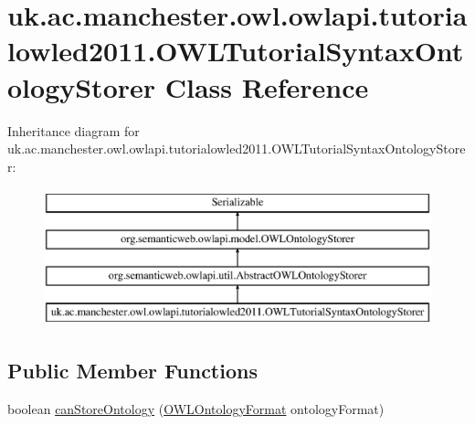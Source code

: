 \hypertarget{classuk_1_1ac_1_1manchester_1_1owl_1_1owlapi_1_1tutorialowled2011_1_1_o_w_l_tutorial_syntax_ontology_storer}{\section{uk.\-ac.\-manchester.\-owl.\-owlapi.\-tutorialowled2011.\-O\-W\-L\-Tutorial\-Syntax\-Ontology\-Storer Class Reference}
\label{classuk_1_1ac_1_1manchester_1_1owl_1_1owlapi_1_1tutorialowled2011_1_1_o_w_l_tutorial_syntax_ontology_storer}
}
Inheritance diagram for uk.\-ac.\-manchester.\-owl.\-owlapi.\-tutorialowled2011.\-O\-W\-L\-Tutorial\-Syntax\-Ontology\-Storer\-:\begin{figure}[H]
\begin{center}
\leavevmode
\includegraphics[height=4.000000cm]{classuk_1_1ac_1_1manchester_1_1owl_1_1owlapi_1_1tutorialowled2011_1_1_o_w_l_tutorial_syntax_ontology_storer}
\end{center}
\end{figure}
\subsection*{Public Member Functions}
\begin{DoxyCompactItemize}
\item 
boolean \hyperlink{classuk_1_1ac_1_1manchester_1_1owl_1_1owlapi_1_1tutorialowled2011_1_1_o_w_l_tutorial_syntax_ontology_storer_a3518367606743358b281e1f442ebcc35}{can\-Store\-Ontology} (\hyperlink{classorg_1_1semanticweb_1_1owlapi_1_1model_1_1_o_w_l_ontology_format}{O\-W\-L\-Ontology\-Format} ontology\-Format)
\end{DoxyCompactItemize}
